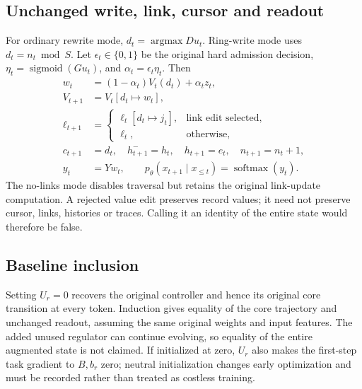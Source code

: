 \documentclass[11pt,a4paper]{article}
\newcommand{\sigmoid}{\operatorname{sigmoid}}
\newcommand{\argmax}{\operatorname{argmax}}
\begin{document}
\subsection{Unchanged write, link, cursor and readout}
For ordinary rewrite mode, \(d_t=\argmax Du_t\). Ring-write mode uses
\(d_t=n_t\bmod S\). Let \(\epsilon_t\in\{0,1\}\) be the original hard
admission decision, \(\eta_t=\sigmoid(Gu_t)\), and
\(\alpha_t=\epsilon_t\eta_t\). Then
\begin{align}
w_t&=(1-\alpha_t)V_t(d_t)+\alpha_tz_t,\\
V_{t+1}&=V_t[d_t\mapsto w_t],\\
\ell_{t+1}&=\begin{cases}\ell_t[d_t\mapsto j_t],&\text{link edit selected},\\
\ell_t,&\text{otherwise},\end{cases}\\
c_{t+1}&=d_t,\quad h^-_{t+1}=h_t,\quad h_{t+1}=e_t,\quad n_{t+1}=n_t+1,\\
y_t&=Yw_t,\qquad p_\theta(x_{t+1}\mid x_{\le t})=\operatorname{softmax}(y_t).
\end{align}
The no-links mode disables traversal but retains the original link-update
computation. A rejected value edit preserves record values; it need not preserve
cursor, links, histories or traces. Calling it an identity of the entire state
would therefore be false.

\subsection{Baseline inclusion}
Setting \(U_r=0\) recovers the original controller and hence its original
core transition at every token. Induction gives equality of the core trajectory
and unchanged readout, assuming the same original weights and input features.
The added unused regulator can continue evolving, so equality of the entire
augmented state is not claimed. If initialized at zero, \(U_r\) also makes the
first-step task gradient to \(B,b_r\) zero; neutral initialization changes early
optimization and must be recorded rather than treated as costless training.
\end{document}
